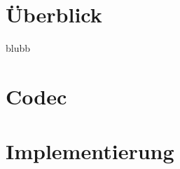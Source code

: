 



\lstset{language=c}





\tableofcontents

\chapter{\"Uberblick}
blubb

\chapter{Codec}

\chapter{Implementierung}


